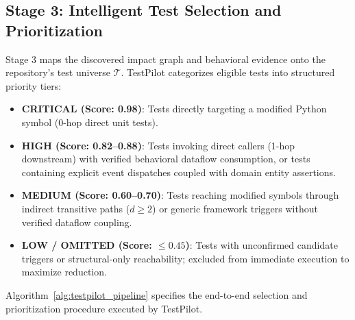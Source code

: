 \documentclass[12pt,onecolumn,draftclsnofoot]{IEEEtran}
\begin{document}
\subsection{Stage 3: Intelligent Test Selection and Prioritization}
Stage 3 maps the discovered impact graph and behavioral evidence onto the repository's test universe $\mathcal{T}$. TestPilot categorizes eligible tests into structured priority tiers:
\begin{itemize}
    \item \textbf{CRITICAL (Score: 0.98)}: Tests directly targeting a modified Python symbol (0-hop direct unit tests).
    \item \textbf{HIGH (Score: 0.82--0.88)}: Tests invoking direct callers (1-hop downstream) with verified behavioral dataflow consumption, or tests containing explicit event dispatches coupled with domain entity assertions.
    \item \textbf{MEDIUM (Score: 0.60--0.70)}: Tests reaching modified symbols through indirect transitive paths ($d \ge 2$) or generic framework triggers without verified dataflow coupling.
    \item \textbf{LOW / OMITTED (Score: $\le 0.45$)}: Tests with unconfirmed candidate triggers or structural-only reachability; excluded from immediate execution to maximize reduction.
\end{itemize}

Algorithm~\ref{alg:testpilot_pipeline} specifies the end-to-end selection and prioritization procedure executed by TestPilot.
\end{document}
